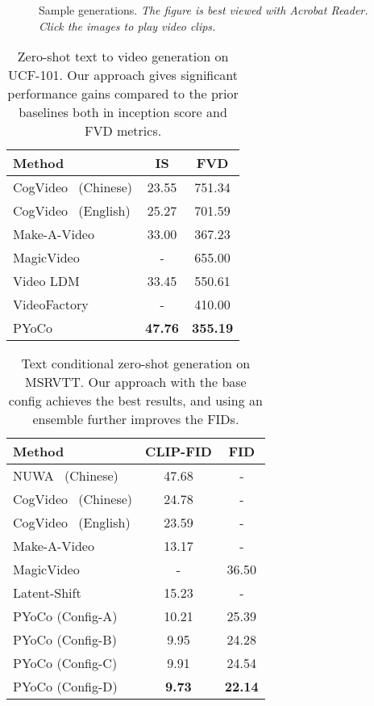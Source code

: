 \documentclass[10pt,twocolumn,letterpaper]{article}
\newcommand{\tabcspace}{\vspace{-2mm}}
\begin{document}
\begin{figure*}[ht!]
    \caption{Sample generations. \textit{The figure is best viewed with Acrobat Reader. Click the images to play video clips.}}
    \vspace{-0.2cm}
    \label{fig:visual_generations}
\end{figure*} 




\setlength{\tabcolsep}{4pt}
\renewcommand{\arraystretch}{1}

\begin{table}[t!]
\centering
\caption{Zero-shot text to video generation on UCF-101. Our approach gives significant performance gains compared to the prior baselines both in inception score and FVD metrics.}
\label{tab:ucf_zeroshot}
\tabcspace
\begin{tabular}{lcc}
\toprule
Method              & IS     & FVD     \\
\midrule
CogVideo~\cite{hong2022cogvideo} (Chinese) & 23.55 & 751.34 \\
CogVideo~\cite{hong2022cogvideo} (English) & 25.27 & 701.59 \\
Make-A-Video~\cite{singer2022make}         & 33.00 & 367.23 \\
MagicVideo~\cite{zhou2022magicvideo}   & - & 655.00 \\
Video LDM~\cite{blattmann2023videoldm}   & 33.45 & 550.61 \\
VideoFactory~\cite{wang2023videofactory}  & - & 410.00 \\
\rowcolor[HTML]{DFDFDF} 
PYoCo       & \textbf{47.76} &  \textbf{355.19} \\
\bottomrule
\end{tabular}
\end{table}

\begin{table}[t!]
\caption{Text conditional zero-shot generation on MSRVTT. Our approach with the base config achieves the best results, and using an ensemble further improves the FIDs.}
\label{tab:msrvtt_zeroshot}
\centering
\begin{tabular}{lcc}
\toprule
Method             & CLIP-FID     & FID  \\
\midrule
NUWA~\cite{wu2022nuwa} (Chinese)     & 47.68 & - \\
CogVideo~\cite{hong2022cogvideo} (Chinese) & 24.78 & - \\
CogVideo~\cite{hong2022cogvideo} (English) & 23.59 & - \\
Make-A-Video~\cite{singer2022make}  & 13.17 & - \\
MagicVideo~\cite{zhou2022magicvideo} & - & 36.50 \\
Latent-Shift~\cite{an2023latent} & 15.23 & - \\
\rowcolor[HTML]{DFDFDF} PYoCo (Config-A) & 10.21 & 25.39 \\
\rowcolor[HTML]{DFDFDF} PYoCo (Config-B) & 9.95  & 24.28 \\
\rowcolor[HTML]{DFDFDF} PYoCo (Config-C) & 9.91  & 24.54 \\
\rowcolor[HTML]{DFDFDF} PYoCo (Config-D) & \textbf{9.73}  & \textbf{22.14} \\
\bottomrule
\end{tabular}
\end{table}
 
\end{document}
